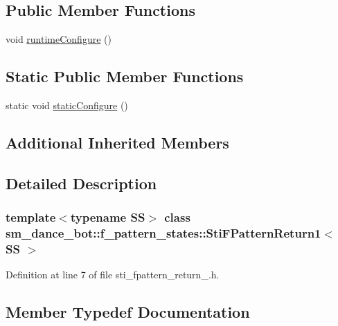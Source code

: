 \subsection*{Public Member Functions}
\begin{DoxyCompactItemize}
\item 
void \hyperlink{structsm__dance__bot_1_1f__pattern__states_1_1StiFPatternReturn1_a888586201a9711546bbd53521d7b72ce}{runtime\+Configure} ()
\end{DoxyCompactItemize}
\subsection*{Static Public Member Functions}
\begin{DoxyCompactItemize}
\item 
static void \hyperlink{structsm__dance__bot_1_1f__pattern__states_1_1StiFPatternReturn1_a8dc2319ebc743b31189067897a9ace78}{static\+Configure} ()
\end{DoxyCompactItemize}
\subsection*{Additional Inherited Members}


\subsection{Detailed Description}
\subsubsection*{template$<$typename SS$>$\newline
class sm\+\_\+dance\+\_\+bot\+::f\+\_\+pattern\+\_\+states\+::\+Sti\+F\+Pattern\+Return1$<$ S\+S $>$}



Definition at line 7 of file sti\+\_\+fpattern\+\_\+return\+\_.\+h.



\subsection{Member Typedef Documentation}
\mbox{\label{structsm__dance__bot_1_1f__pattern__states_1_1StiFPatternReturn1_a747aac2531a2b77a918254033102a118}} 
